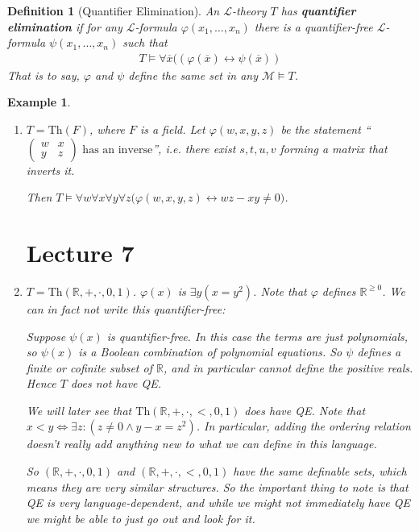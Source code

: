 \documentclass[]{article}
\theoremstyle{custhm}
\theoremstyle{cusdef}
\newtheorem{defin}[theorem]{Definition}
\theoremstyle{custhm}
\theoremstyle{custhm}
\theoremstyle{custhm}
\theoremstyle{ex}
\newtheorem{ex}[theorem]{Example}
\theoremstyle{custhm}
\theoremstyle{cusdef}
\theoremstyle{remark}
\theoremstyle{remark}
\theoremstyle{numremark}
\newcommand{\R}{\mathbb{R}}
\newcommand{\undf}[1]{\textit{\textbf{#1}}}
\renewcommand{\L}{\mathcal{L}}
\renewcommand{\it}[1]{\textit{#1}}
\newcommand{\M}{\mathcal{M}}
\renewcommand{\phi}{\varphi}
\renewcommand{\bar}{\overline}
\newcommand{\Th}{\textrm{Th}}
\begin{document}
\begin{defin}[Quantifier Elimination]
An $\L$-theory $T$ has \undf{quantifier elimination} if for any $\L$-formula $\phi(x_1,\dots,x_n)$ there is a quantifier-free $\L$-formula $\psi(x_1,\dots,x_n)$ such that
\begin{align*}
T\models \forall \bar{x}\big((\phi(\bar{x})\leftrightarrow \psi(\bar{x}))
\end{align*}
That is to say, $\phi$ and $\psi$ define the same set in any $\M\models T$.
\end{defin}

\begin{ex}\ 
\begin{enumerate}[label=(\arabic*)]
\item $T = \Th(F)$, where $F$ is a field. Let $\phi(w,x,y,z)$ be the statement ``$\left(\begin{array}{cc} w & x\\ y & z\end{array}\right)\textrm{ has an inverse}$'', {\it i.e.} there exist $s,t,u,v$ forming a matrix that inverts it.

Then $T\models \forall w\forall x\forall y\forall z\big(\phi(w,x,y,z)\leftrightarrow wz-xy\ne 0\big)$.

\section{Lecture 7}

\item $T = \Th(\R,+,\cdot,0,1)$. $\phi(x)$ is $\exists y(x = y^2)$. Note that $\phi$ defines $\R^{\ge 0}$. We can in fact not write this quantifier-free:

Suppose $\psi(x)$ is quantifier-free. In this case the terms are just polynomials, so $\psi(x)$ is a Boolean combination of polynomial equations. So $\psi$ defines a finite or cofinite subset of $\R$, and in particular cannot define the positive reals. Hence $T$ does not have QE.

We will later see that $\Th(\R,+,\cdot,<,0,1)$ {\it does} have QE. Note that $x < y \iff \exists z: (z\ne 0 \land y-x = z^2)$. In particular, adding the ordering relation doesn't really add anything new to what we can define in this language.

So $(\R,+,\cdot,0,1)$ and $(\R,+,\cdot,<,0,1)$ have the same definable sets, which means they are very similar structures. So the important thing to note is that QE is very language-dependent, and while we might not immediately have QE we might be able to just go out and look for it.
\end{enumerate}
\end{ex}
\end{document}
